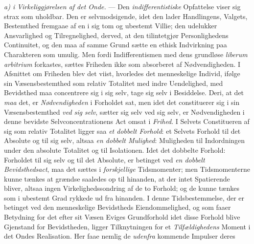 \emph{a) i Virkeliggjørelsen af det Onde.} --- Den \emph{indifferentistiske}
Opfattelse viser sig strax som uholdbar. Den
 er selvmodsigende, idet den lader Handlingens, Valgets, Bestemthed fremgaae af en
i sig tom og ubestemt Villie; den udelukker Ansvarlighed og Tilregnelighed,
derved, at den tilintetgjør Personlighedens Continuitet, og den maa af samme
Grund sætte en ethisk Indvirkning paa Charakteren som umulig. Men fordi
Indifferentismen med dens grundløse \textit{liberum arbitrium} forkastes, sættes
Friheden ikke som absorberet af Nødvendigheden. I Afsnittet om Friheden blev det
viist, hvorledes det menneskelige Individ, ifølge sin Væsensbestemthed som
relativ Totalitet med indre Uendelighed, med Bevidsthed maa concentrere sig i sig
selv, tage sig selv i Besiddelse. Deri, at det \emph{maa} det, er
\emph{Nødvendigheden} i Forholdet sat, men idet det constituerer sig i sin
Væsensbestemthed \emph{ved sig selv}, sætter sig selv ved sig selv, er
Nødvendigheden i denne bevidste Selvconcentrationens Act omsat i \emph{Frihed}. I
Selvets Constitueren af sig som relativ Totalitet ligger saa \emph{et dobbelt
Forhold}: et Selvets Forhold til det Absolute og til sig selv, altsaa \emph{en
dobbelt Mulighed}: Muligheden til Indordningen under den absolute Totalitet og
til Isolationen. Idet det dobbelte Forhold: Forholdet til sig selv og til det
Absolute, er betinget ved \emph{en dobbelt Bevidsthedsact}, maa det sættes i
\emph{forskjellige} Tidsmomenter; men Tidsmomenterne kunne tænkes at grændse
saaledes op til hinanden, at der intet Spatierende bliver, altsaa ingen
Virkelighedssondring af de to Forhold; og de kunne tænkes som i ubestemt Grad
rykkede ud fra hinanden. I denne Tidsbestemmelse, der er betinget ved den
menneskelige Bevidstheds Eiendommelighed, og som faaer Betydning for det efter
sit Væsen Eviges Grundforhold idet disse Forhold blive Gjenstand for
Bevidstheden, ligger Tilknytningen for et \emph{Tilfældighedens} Moment i det
Ondes Realisation. Her faae nemlig de \emph{udenfra} kommende Impulser deres
